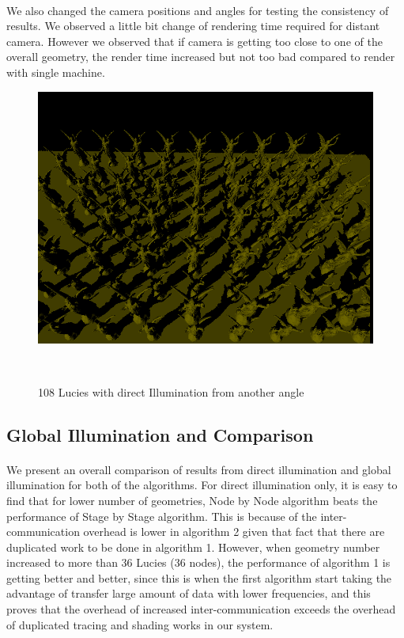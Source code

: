 \documentclass[a4paper, oneside, 10pt]{article}
\begin{document}
\paragraph{}We also changed the camera positions and angles for testing the consistency of results. We observed a little bit change of rendering time required for distant camera. However we observed that if camera is getting too close to one of the overall geometry, the render time increased but not too bad compared to render with single machine. 
\begin{figure}[h]
\centering
\includegraphics[width=\textwidth]{d108lucy_2}
\caption{108 Lucies with direct Illumination from another angle}\
\end{figure}
\subsection{Global Illumination and Comparison}
\paragraph{}We present an overall comparison of results from direct illumination and global illumination for both of the algorithms. For direct illumination only, it is easy to find that for lower number of geometries, Node by Node algorithm beats the performance of Stage by Stage algorithm. This is because of the inter-communication overhead is lower in algorithm 2 given that fact that there are duplicated work to be done in algorithm 1. However, when geometry number increased to more than 36 Lucies (36 nodes), the performance of algorithm 1 is getting better and better, since this is when the first algorithm start taking the advantage of transfer large amount of data with lower frequencies, and this proves that the overhead of increased inter-communication exceeds the overhead of duplicated tracing and shading works in our system.
\end{document}
